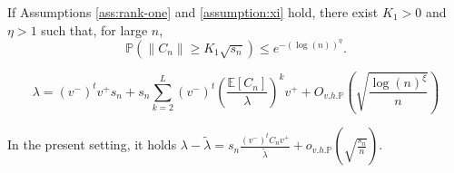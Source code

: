 \documentclass[10pt,a4paper]{amsart}
\newcommand{\E}{\mathbb{E}}
\newcommand{\Ohp}{O_{v.h.\p}}
\newcommand{\centered}{C_n}
\newcommand{\ohp}{o_{v.h.\p}}
\newcommand{\p}{\mathbb{P}}
\newcommand{\scaling}{s_n}
\newcommand{\x}{{{v}}^+}
\newcommand{\y}{{{v}}^-}
\begin{document}
\begin{proposition}
\label{prop:prop-W}
If Assumptions \ref{ass:rank-one} and \ref{assumption:xi} hold, there exist $K_1>0$ and $\eta>1$ such that, for large $n$,
\begin{equation}
    \p\left(\|\centered\|\ge K_1\sqrt{\scaling}\right)\le e^{-(\log(n))^{\eta}}.
\end{equation}
\end{proposition}

\begin{equation} \label{eq:lambda}
    \lambda 
    = (\y)^t\x \scaling + \scaling \sum_{k=2}^{L} (v^-)^t \left(\frac{\E[\centered]}{\lambda}\right)^k v^+ + \Ohp\left(\sqrt{\frac{\log(n)^{\xi}}{n}}\right)
\end{equation}

\begin{lemma} \label{lem:fixed-point}
   In the present setting, it holds
        $\lambda -\tilde{\lambda}=\scaling\frac{(v^-)^t \centered v^+}{\tilde\lambda}+\ohp\left(\sqrt{\frac{\scaling}{n}}\right).$
\end{lemma}
\end{document}
